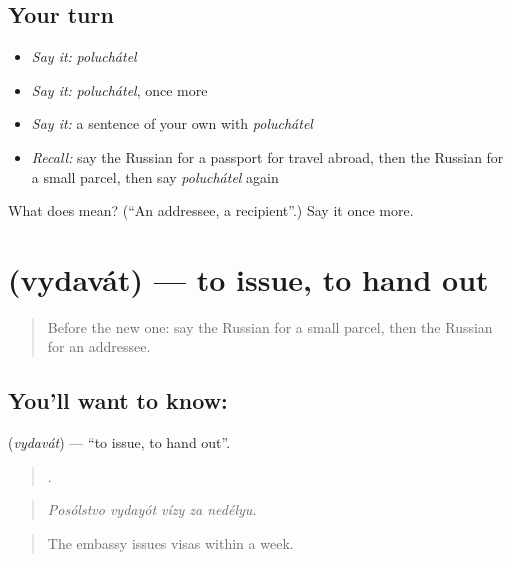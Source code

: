 \subsection*{Your turn}
\begin{itemize}
\raggedright
  \item \emph{Say it:} \emph{poluchátel}
  \item \emph{Say it:} \emph{poluchátel}, once more
  \item \emph{Say it:} a sentence of your own with \emph{poluchátel}
  \item \emph{Recall:} say the Russian for a passport for travel abroad, then the Russian for a small parcel, then say \emph{poluchátel} again
\end{itemize}

\begin{tcolorbox}[breakable,colback=teal!4,colframe=teal!35!black,title={Before you move on}]
What does  mean? (\textquotedblleft{}An addressee, a recipient\textquotedblright{}.) Say it once more.
\end{tcolorbox}
\section[\texorpdfstring{\ru{выдавать} (vydavát)}{выдавать (vydavát)}]{ (vydavát) — to issue, to hand out}

\label{lesson:RU-C451-vydavat}



\begin{quote}
Before the new one: say the Russian for a small parcel, then the Russian for an addressee.
\end{quote}

\subsection*{You'll want to know: }
\textbf{} (\emph{vydavát}) — \textquotedblleft{}to issue, to hand out\textquotedblright{}.

\begin{quote}
    .
\end{quote}

\begin{quote}
\emph{Posólstvo vydayót vízy za nedélyu.}
\end{quote}

\begin{quote}
The embassy issues visas within a week.
\end{quote}

